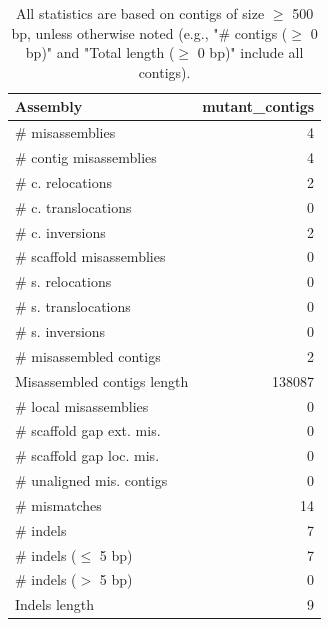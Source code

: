 \documentclass[12pt,a4paper]{article}
\begin{document}
\begin{table}[ht]
\begin{center}
\caption{All statistics are based on contigs of size $\geq$ 500 bp, unless otherwise noted (e.g., "\# contigs ($\geq$ 0 bp)" and "Total length ($\geq$ 0 bp)" include all contigs).}
\begin{tabular}{|l*{1}{|r}|}
\hline
Assembly & mutant\_contigs \\ \hline
\# misassemblies & 4 \\ \hline
\hspace{2mm}\# contig misassemblies & 4 \\ \hline
\hspace{5mm}\# c. relocations & 2 \\ \hline
\hspace{5mm}\# c. translocations & 0 \\ \hline
\hspace{5mm}\# c. inversions & 2 \\ \hline
\hspace{2mm}\# scaffold misassemblies & 0 \\ \hline
\hspace{5mm}\# s. relocations & 0 \\ \hline
\hspace{5mm}\# s. translocations & 0 \\ \hline
\hspace{5mm}\# s. inversions & 0 \\ \hline
\# misassembled contigs & 2 \\ \hline
Misassembled contigs length & 138087 \\ \hline
\# local misassemblies & 0 \\ \hline
\# scaffold gap ext. mis. & 0 \\ \hline
\# scaffold gap loc. mis. & 0 \\ \hline
\# unaligned mis. contigs & 0 \\ \hline
\# mismatches & 14 \\ \hline
\# indels & 7 \\ \hline
\hspace{5mm}\# indels ($\leq$ 5 bp) & 7 \\ \hline
\hspace{5mm}\# indels ($>$ 5 bp) & 0 \\ \hline
Indels length & 9 \\ \hline
\end{tabular}
\end{center}
\end{table}
\end{document}
